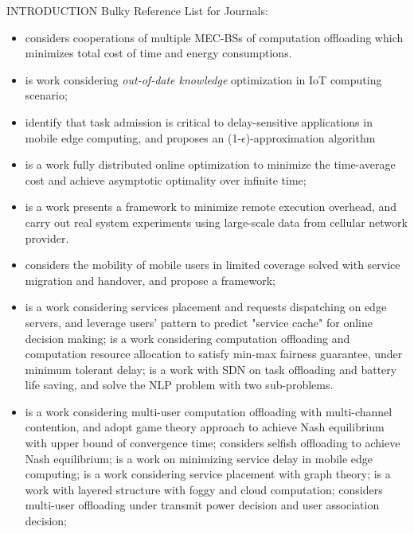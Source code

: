 \documentclass[10pt, conference, letterpaper]{IEEEtran}
\begin{document}
\begin{section}{INTRODUCTION}
        Bulky Reference List for Journals:
        \begin{itemize}
            \item {} \cite{Fan2017} considers cooperations of multiple MEC-BSs of computation offloading which minimizes total cost of time and energy consumptions.
            \item {} \cite{Lyu2017} is work considering \emph{out-of-date knowledge} optimization in IoT computing scenario;
            \item {} \cite{Lyu2018} identify that task admission is critical to delay-sensitive applications in mobile edge computing, and proposes an (1-$\epsilon$)-approximation algorithm
            \item {} \cite{Lyu2018a} is a work fully distributed online optimization to minimize the time-average cost and achieve asymptotic optimality over infinite time;
            \item {} \cite{Yu2018} is a work presents a framework to minimize remote execution overhead, and carry out real system experiments using large-scale data from cellular network provider.
            \item {} \cite{Wang2018} considers the mobility of mobile users in limited coverage solved with service migration and handover, and propose a framework;
            \item {}
                \cite{Yang2016} is a work considering services placement and requests dispatching on edge servers, and leverage users' pattern to predict "service cache" for online decision making;
                \cite{Du2018} is a work considering computation offloading and computation resource allocation to satisfy min-max fairness guarantee, under minimum tolerant delay;
                \cite{Chen2018} is a work with SDN on task offloading and battery life saving, and solve the NLP problem with two sub-problems.
            \item \text{[misc]}
                \cite{Chen2016} is a work considering multi-user computation offloading with multi-channel contention, and adopt game theory approach to achieve Nash equilibrium with upper bound of convergence time;
                \cite{Josilo2019} considers selfish offloading to achieve Nash equilibrium;
                \cite{Rodrigues2017} is a work on minimizing service delay in mobile edge computing;
                \cite{Wang2017} is a work considering service placement with graph theory;
                \cite{Masip-Bruin2016} is a work with layered structure with foggy and cloud computation;
                \cite{Zhang2018} considers multi-user offloading under transmit power decision and user association decision;
                

\end{itemize}
\end{section}
\end{document}
